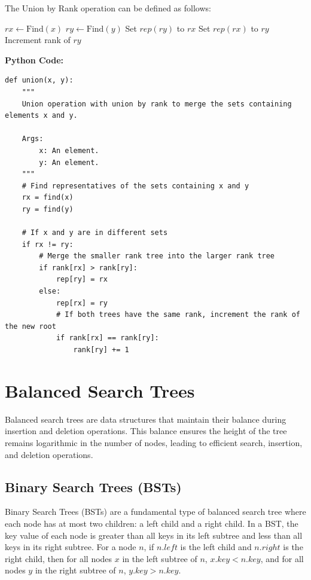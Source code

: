 \documentclass[12pt]{book} %
\begin{document}
The Union by Rank operation can be defined as follows:
\FloatBarrier
\begin{algorithm}[H]
\caption{Union(\(x, y\)) with Union by Rank}
\begin{algorithmic}[1]
    \State \(rx \gets \text{Find}(x)\)
    \State \(ry \gets \text{Find}(y)\)
            \State Set \(rep(ry)\) to \(rx\)
        \Else
            \State Set \(rep(rx)\) to \(ry\)
                \State Increment rank of \(ry\)
            \EndIf
        \EndIf
    \EndIf
\EndFunction
\end{algorithmic}
\end{algorithm}
\FloatBarrier
\textbf{Python Code:}
\FloatBarrier
\begin{lstlisting}
def union(x, y):
    """
    Union operation with union by rank to merge the sets containing elements x and y.
    
    Args:
        x: An element.
        y: An element.
    """
    # Find representatives of the sets containing x and y
    rx = find(x)
    ry = find(y)
    
    # If x and y are in different sets
    if rx != ry:
        # Merge the smaller rank tree into the larger rank tree
        if rank[rx] > rank[ry]:
            rep[ry] = rx
        else:
            rep[rx] = ry
            # If both trees have the same rank, increment the rank of the new root
            if rank[rx] == rank[ry]:
                rank[ry] += 1
\end{lstlisting}

\section{Balanced Search Trees}
Balanced search trees are data structures that maintain their balance during insertion and deletion operations. This balance ensures the height of the tree remains logarithmic in the number of nodes, leading to efficient search, insertion, and deletion operations.

\subsection{Binary Search Trees (BSTs)}
Binary Search Trees (BSTs) are a fundamental type of balanced search tree where each node has at most two children: a left child and a right child. In a BST, the key value of each node is greater than all keys in its left subtree and less than all keys in its right subtree. For a node \(n\), if \(n.left\) is the left child and \(n.right\) is the right child, then for all nodes \(x\) in the left subtree of \(n\), \(x.key < n.key\), and for all nodes \(y\) in the right subtree of \(n\), \(y.key > n.key\).
\end{document}
